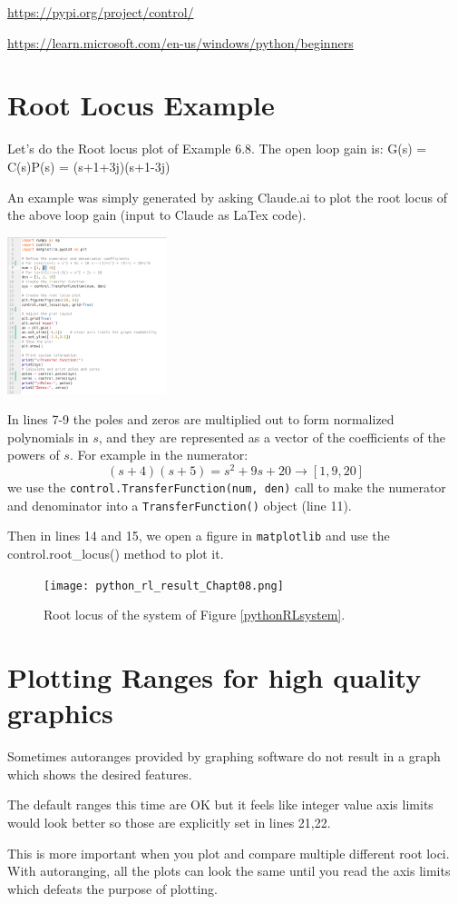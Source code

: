 \href{python control}{https://pypi.org/project/control/}

\href{Install Python on Windows}{https://learn.microsoft.com/en-us/windows/python/beginners}


\section{Root Locus Example}

Let's do the Root locus plot of Example 6.8.  The open loop gain is:
\beq\label{pythonRLsystem}
G(s) = C(s)P(s) =  {(s+1+3j)(s+1-3j)}
\eeq

An example was simply generated by asking Claude.ai to plot the root locus of the above loop gain (input to Claude as LaTex code).

\includegraphics[width=0.35\textwidth]{figs08/python_rl_code_Chapt08.png}

In lines 7-9 the poles and zeros are multiplied out to form normalized polynomials in $s$, and
they are represented as a vector of the coefficients of the powers of $s$.  For example in the
numerator:
\[
(s+4)(s+5) = s^2 + 9s + 20 \to [1, 9, 20]
\]
we use the {\tt control.TransferFunction(num, den)}  call to make the numerator and denominator into
a {\tt TransferFunction()} object (line 11).

Then in lines 14 and 15, we open a figure in {\tt matplotlib} and use the {control.root_locus()} method to plot it.

\begin{figure}
    \texttt{[image: python\_rl\_result\_Chapt08.png]}
    \caption{Root locus of the system of Figure \ref{pythonRLsystem}.}\label{pythonRLoutput}
\end{figure}

\section{Plotting Ranges for high quality graphics}
Sometimes autoranges provided by graphing software do not result in a graph which shows the desired features.

The default ranges this time are OK but it feels like integer value axis limits would look better
so those are explicitly set in lines 21,22.

This is more important when you plot and compare multiple different root loci.   With autoranging,
all the plots can look the same until you read the axis limits which defeats the purpose of plotting.



